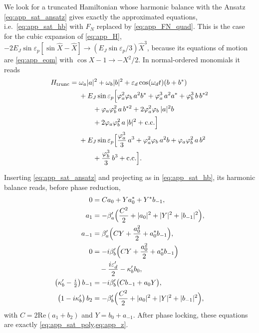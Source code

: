 \documentclass[aps,prx,reprint,floatfix,amsmath,amssymb,longbibliography]{revtex4-2}
\begin{document}
We look for a truncated Hamiltonian whose harmonic balance with the Ansatz \cref{eq:app_sat_ansatz} gives exactly the approximated equations, i.e.\ \cref{eq:app_sat_hb} with $F_N$ replaced by \cref{eq:app_FN_quad}. This is the case for the cubic expansion of \cref{eq:app_H}, $-2E_J\sin\varepsilon_p[\sin\hat X-\hat X]\to(E_J\sin\varepsilon_p/3)\hat X^3$, because its equations of motion are \cref{eq:app_eom} with $\cos X-1\to-X^2/2$. In normal-ordered monomials it reads
\begin{equation}
\begin{split}
    H_\text{trunc} = {}& \omega_a|a|^2 + \omega_b|b|^2 + \varepsilon_d\cos(\omega_d t)(b+b^*)\\
    &+ E_J\sin\varepsilon_p\Bigl[
    \varphi_a^2\varphi_b\,a^2 b^*
    + \varphi_a^3\,a^2a^*
    + \varphi_b^3\,b\,b^{*2}\\
    &\qquad + \varphi_a\varphi_b^2\,a\,b^{*2}
    + 2\varphi_a^2\varphi_b\,|a|^2 b\\
    &\qquad + 2\varphi_a\varphi_b^2\,a\,|b|^2
    + \text{c.c.}\Bigr]\\
    &+ E_J\sin\varepsilon_p\Bigl[
    \frac{\varphi_a^3}{3}\,a^3
    + \varphi_a^2\varphi_b\,a^2 b
    + \varphi_a\varphi_b^2\,a\,b^2\\
    &\qquad + \frac{\varphi_b^3}{3}\,b^3
    + \text{c.c.}\Bigr].
\end{split}
\label{eq:app_Htrunc}
\end{equation}

Inserting \cref{eq:app_sat_ansatz} and projecting as in \cref{eq:app_sat_hb}, its harmonic balance reads, before phase reduction,
\begin{equation}
\begin{split}
    0 &= C a_0 + Y a_0^* + Y^* b_{-1},\\
    a_1 &= -\beta_a'\Bigl(\frac{C^2}{2} + |a_0|^2 + |Y|^2 + |b_{-1}|^2\Bigr),\\
    a_{-1} &= \beta_a'\Bigl(CY + \frac{a_0^2}{2} + a_0^* b_{-1}\Bigr),\\
    0 &= -i\beta_b'\Bigl(CY + \frac{a_0^2}{2} + a_0^* b_{-1}\Bigr)\\
    &\quad - \frac{i\varepsilon_d'}{2} - \kappa_b' b_0,\\
    \bigl(\kappa_b' - \tfrac{i}{2}\bigr)\,b_{-1} &= -i\beta_b'\bigl(C b_{-1} + a_0 Y\bigr),\\
    \bigl(1-i\kappa_b'\bigr)\,b_2 &= -\beta_b'\Bigl(\frac{C^2}{2} + |a_0|^2 + |Y|^2 + |b_{-1}|^2\Bigr),
\end{split}
\label{eq:app_sat_hb_quad}
\end{equation}
with $C=2\mathrm{Re}(a_1+b_2)$ and $Y=b_0+a_{-1}$. After phase locking, these equations are exactly \cref{eq:app_sat_poly,eq:app_z}.
\end{document}
